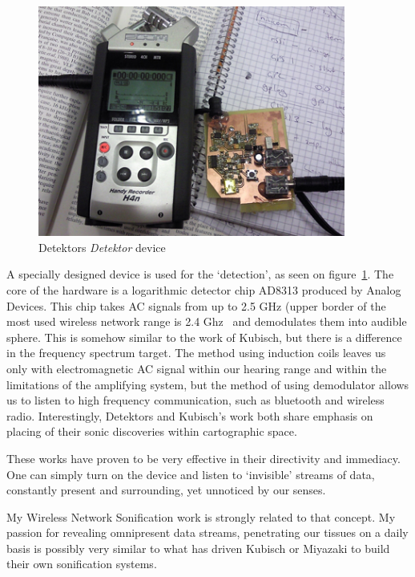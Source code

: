 \documentclass[12pt,a4paper,oneside]{report}
\begin{document}
\begin{figure}  
  \centering
    \includegraphics[width=0.9\textwidth]{img/detektor}
	\caption{Detektors \emph{Detektor} device}
	\label{fig:detektor}
\end{figure}

A specially designed device is used for the `detection', as seen on figure~\ref{fig:detektor}. The core of the hardware is a logarithmic detector chip AD8313 produced by Analog Devices. This chip takes AC signals from up to 2.5 GHz  (upper border of the most used wireless network range is 2.4 Ghz~\cite{802} and demodulates them into audible sphere. This is somehow similar to the work of Kubisch, but there is a difference in the frequency spectrum target. The method using induction coils leaves us only with electromagnetic AC signal within our hearing range and within the limitations of the amplifying system, but the method of using demodulator allows us to listen to high frequency communication, such as bluetooth and wireless radio. Interestingly, Detektors and Kubisch's work both share emphasis on placing of their sonic discoveries within cartographic space.

These works have proven to be very effective in their directivity and immediacy. One can simply turn on the device and listen to `invisible' streams of data, constantly present and surrounding, yet unnoticed by our senses. 

My Wireless Network Sonification work is strongly related to that concept. My passion for revealing omnipresent data streams, penetrating our tissues on a daily basis is possibly very similar to what has driven Kubisch or Miyazaki to build their own sonification systems.  
\end{document}
